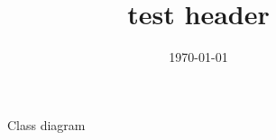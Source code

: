 \documentclass{article}
\title{test header}
\author{}
\date{\today}
\begin{document}
\begin{figure}
\centering
\begingroup

% 


% 

\caption{Class diagram}
\endgroup
\end{figure}
\end{document}
